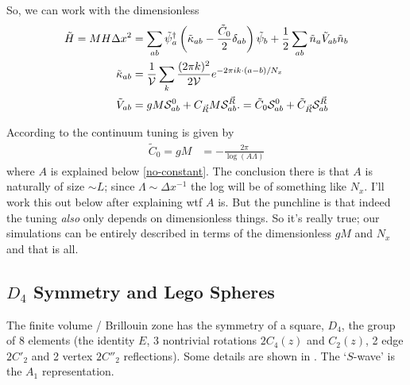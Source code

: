 So, we can work with the dimensionless
\begin{align}
	\tilde{H} = MH\Delta x^2 &= 
		\sum_{ab} \tilde{\psi}{}^{\dagger}_a \left(
			\tilde{\kappa}_{ab}
			- \frac{\tilde{C}_0}{2} \delta_{ab}
			\right) \tilde{\psi}_b
		+ \frac{1}{2} \sum_{ab} \tilde{n}_a \tilde{V}_{ab} \tilde{n}_b
\\
	\tilde{\kappa}_{ab} &=
				\frac{1}{\mathcal{V}} \sum_{k} \frac{(2\pi k)^2}{2 \mathcal{V}} e^{-2\pi i k \cdot(a-b)/N_x} 
\\
	\tilde{V}_{ab} &= 
				gM \mathcal{S}^{0}_{ab}
				+ C_{\vec{R}} M \mathcal{S}^{\vec{R}}_{ab}.
				=
				\tilde{C}_0 \mathcal{S}^{0}_{ab}
				+ \tilde{C}_{\vec{R}} \mathcal{S}^{\vec{R}}_{ab}
\end{align}

According to  the continuum tuning is given by
\begin{align}
	\tilde{C}_0 = gM &= - \frac{2\pi}{\log(A \Lambda)}
	\label{eq:tuning}
\end{align}
where $A$ is explained below \eqref{no-constant}.
The conclusion there is that $A$ is naturally of size $\sim L$; since $\Lambda\sim \Delta x^{-1}$ the log will be of something like $N_x$.
I'll work this out below after explaining wtf $A$ is.
But the punchline is that indeed the tuning \emph{also} only depends on dimensionless things.
So it's really true; our simulations can be entirely described in terms of the dimensionless $gM$ and $N_x$ and that is all.

\subsection{$D_4$ Symmetry and Lego Spheres}

The finite volume / Brillouin zone has the symmetry of a square, $D_4$, the group of 8 elements (the identity $E$, 3 nontrivial rotations $2C_4(z)$ and $C_2(z)$, 2 edge $2C'_2$ and 2 vertex $2C''_2$ reflections).
Some details are shown in .
The `$S$-wave' is the $A_1$ representation.

